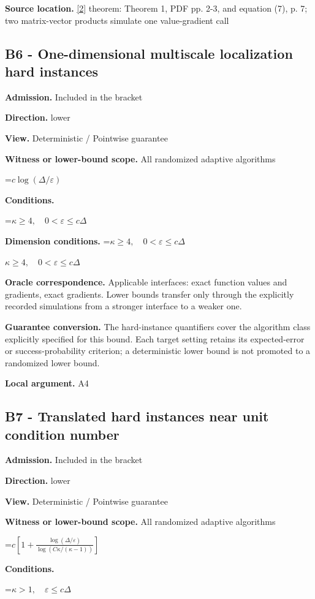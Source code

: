 \documentclass[10pt,a4paper]{article}
\newcommand{\AtlasMath}[1]{\par\begingroup\centering\setbox0=\hbox{$\displaystyle #1$}\ifdim\wd0>1.4\linewidth\typeout{ATLAS WIDE FORMULA: \the\wd0}\fi\ifdim\wd0>\linewidth\resizebox{\linewidth}{!}{\box0}\else\box0\fi\par\endgroup}
\newcommand{\AtlasInlineMath}[1]{\begingroup\setbox0=\hbox{$#1$}\ifdim\wd0>.4\linewidth\endgroup\AtlasMath{#1}\else\endgroup$#1$\fi}
\begin{document}
\textbf{Source location.} \href{https://arxiv.org/pdf/2609.10874}{[2]} theorem: Theorem 1, PDF pp. 2-3, and equation (7), p. 7; two matrix-vector products simulate one value-gradient call

\subsection{B6 - One-dimensional multiscale localization hard instances}
\textbf{Admission.} Included in the bracket

\textbf{Direction.} lower

\textbf{View.} Deterministic / Pointwise guarantee

\textbf{Witness or lower-bound scope.} All randomized adaptive algorithms

\AtlasMath{c\log(\Delta/\varepsilon)}
\textbf{Conditions.} 
\AtlasMath{\kappa\ge4,\quad0<\varepsilon\le c\Delta}


\textbf{Dimension conditions.} \AtlasInlineMath{\kappa\ge4,\quad0<\varepsilon\le c\Delta}

\textbf{Oracle correspondence.} Applicable interfaces: exact function values and gradients, exact gradients. Lower bounds transfer only through the explicitly recorded simulations from a stronger interface to a weaker one.

\textbf{Guarantee conversion.} The hard-instance quantifiers cover the algorithm class explicitly specified for this bound. Each target setting retains its expected-error or success-probability criterion; a deterministic lower bound is not promoted to a randomized lower bound.

\textbf{Local argument.} A4

\subsection{B7 - Translated hard instances near unit condition number}
\textbf{Admission.} Included in the bracket

\textbf{Direction.} lower

\textbf{View.} Deterministic / Pointwise guarantee

\textbf{Witness or lower-bound scope.} All randomized adaptive algorithms

\AtlasMath{c\left[1+\frac{\log(\Delta/\varepsilon)}{\log(C\kappa/(\kappa-1))}\right]}
\textbf{Conditions.} 
\AtlasMath{\kappa>1,\quad\varepsilon\le c\Delta}
\end{document}
